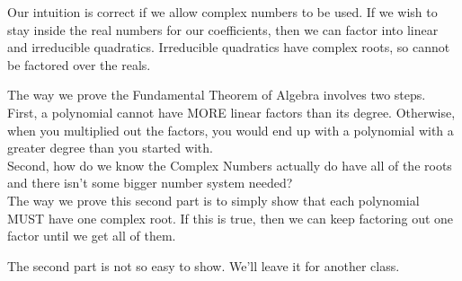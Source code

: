 \documentclass{ximera}
\begin{document}
Our intuition is correct if we allow complex numbers to be used.  If we wish to stay inside the real numbers for our coefficients, then we can factor into linear and irreducible quadratics.  Irreducible quadratics have complex roots, so cannot be factored over the reals.



\begin{idea}


The way we prove the Fundamental Theorem of Algebra involves two steps. \\


First, a polynomial cannot have MORE linear factors than its degree. Otherwise, when you multiplied out the factors, you would end up with a polynomial with a greater degree than you started with.\\


Second, how do we know the Complex Numbers actually do have all of the roots and there isn't some bigger number system needed? \\

The way we prove this second part is to simply show that each polynomial MUST have one complex root. If this is true, then we can keep factoring out one factor until we get all of them.

The second part is not so easy to show.  We'll leave it for another class.


\end{idea}
\end{document}
